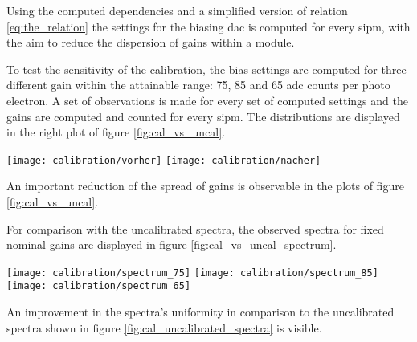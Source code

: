 Using the computed dependencies and a simplified version of relation \ref{eq:the_relation} the settings for the biasing \gls{dac} is computed for every \gls{sipm}, with the aim to reduce the dispersion of gains within a module.

To test the sensitivity of the calibration, the bias settings are computed for three different gain within the attainable range: 75, 85 and 65 \gls{adc} counts per photo electron.
A set of observations is made for every set of computed settings and the gains are computed and counted for every \gls{sipm}.
The distributions are displayed in the right plot of figure \ref{fig:cal_vs_uncal}.

\begin{figure*}
  \centering
  \texttt{[image: calibration/vorher]}
  \texttt{[image: calibration/nacher]}
  \caption{%
    The plot on the left shows the spectrum of computed gains for fixed \gls{dac} settings for every \gls{sipm}.
    The plot on the right displays the distribution of gains after the calibration process.
    To make the change more visible, the same range for the x axis is used.
  }
  \label{fig:cal_vs_uncal}
\end{figure*}

An important reduction of the spread of gains is observable in the plots of figure \ref{fig:cal_vs_uncal}.

For comparison with the uncalibrated spectra, the observed spectra for fixed nominal gains are displayed in figure \ref{fig:cal_vs_uncal_spectrum}.

\begin{figure*}
  \centering
  \texttt{[image: calibration/spectrum\_75]}
  \texttt{[image: calibration/spectrum\_85]}
  \texttt{[image: calibration/spectrum\_65]}
  \caption{%
    Observed spectra after calibration process.
  }
  \label{fig:cal_vs_uncal_spectrum}
\end{figure*}

An improvement in the spectra's uniformity in comparison to the uncalibrated spectra shown in figure \ref{fig:cal_uncalibrated_spectra} is visible.
